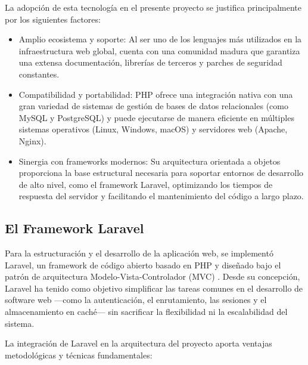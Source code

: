 La adopción de esta tecnología en el presente proyecto se justifica
principalmente por los siguientes factores:

\begin{itemize}
	\item Amplio ecosistema y soporte: Al ser uno de los lenguajes
		más utilizados en la infraestructura web global, cuenta con una
		comunidad madura que garantiza una extensa documentación, librerías
		de terceros y parches de seguridad constantes.

	\item Compatibilidad y portabilidad: PHP ofrece una integración nativa
		con una gran variedad de sistemas de gestión de bases de datos
		relacionales (como MySQL y PostgreSQL) y puede ejecutarse de manera
		eficiente en múltiples sistemas operativos (Linux, Windows, macOS)
		y servidores web (Apache, Nginx).

	\item Sinergia con frameworks modernos: Su arquitectura orientada a
		objetos proporciona la base estructural necesaria para soportar
		entornos de desarrollo de alto nivel, como el framework Laravel,
		optimizando los tiempos de respuesta del servidor y facilitando
		el mantenimiento del código a largo plazo.
\end{itemize}

\subsection{El Framework Laravel}

Para la estructuración y el desarrollo de la aplicación web, se
implementó Laravel, un framework de código abierto basado en PHP y
diseñado bajo el patrón de arquitectura Modelo-Vista-Controlador (MVC)
\parencite{otwell_laravel_2026}. Desde su concepción, Laravel ha tenido
como objetivo simplificar las tareas comunes en el desarrollo de software
web —como la autenticación, el enrutamiento, las sesiones y el
almacenamiento en caché— sin sacrificar la flexibilidad ni la
escalabilidad del sistema.

La integración de Laravel en la arquitectura del proyecto aporta ventajas
metodológicas y técnicas fundamentales:

